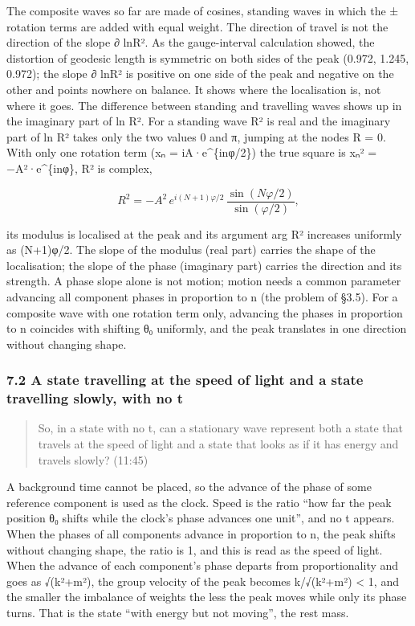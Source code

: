 \documentclass[
  a4paper,
]{article}
\begin{document}
The composite waves so far are made of cosines, standing waves in which
the ± rotation terms are added with equal weight. The direction of
travel is not the direction of the slope ∂ ln\textbar R²\textbar. As the
gauge-interval calculation showed, the distortion of geodesic length is
symmetric on both sides of the peak (0.972, 1.245, 0.972); the slope ∂
ln\textbar R²\textbar{} is positive on one side of the peak and negative
on the other and points nowhere on balance. It shows where the
localisation is, not where it goes. The difference between standing and
travelling waves shows up in the imaginary part of ln R². For a standing
wave R² is real and the imaginary part of ln R² takes only the two
values 0 and π, jumping at the nodes R = 0. With only one rotation term
(xₙ = iA·e\^{}\{inφ/2\}) the true square is xₙ² = −A²·e\^{}\{inφ\}, R²
is complex,

\[
R^2=-A^2\,e^{i(N+1)\varphi/2}\,\frac{\sin(N\varphi/2)}{\sin(\varphi/2)},
\]

its modulus is localised at the peak and its argument arg R² increases
uniformly as (N+1)φ/2. The slope of the modulus (real part) carries the
shape of the localisation; the slope of the phase (imaginary part)
carries the direction and its strength. A phase slope alone is not
motion; motion needs a common parameter advancing all component phases
in proportion to n (the problem of §3.5). For a composite wave with one
rotation term only, advancing the phases in proportion to n coincides
with shifting θ₀ uniformly, and the peak translates in one direction
without changing shape.

\subsubsection{7.2 A state travelling at the speed of light and a state
travelling slowly, with no
t}\label{a-state-travelling-at-the-speed-of-light-and-a-state-travelling-slowly-with-no-t}

\begin{quote}
So, in a state with no t, can a stationary wave represent both a state
that travels at the speed of light and a state that looks as if it has
energy and travels slowly? (11:45)
\end{quote}

A background time cannot be placed, so the advance of the phase of some
reference component is used as the clock. Speed is the ratio ``how far
the peak position θ₀ shifts while the clock's phase advances one unit'',
and no t appears. When the phases of all components advance in
proportion to n, the peak shifts without changing shape, the ratio is 1,
and this is read as the speed of light. When the advance of each
component's phase departs from proportionality and goes as √(k²+m²), the
group velocity of the peak becomes k/√(k²+m²) \textless{} 1, and the
smaller the imbalance of weights the less the peak moves while only its
phase turns. That is the state ``with energy but not moving'', the rest
mass.
\end{document}
